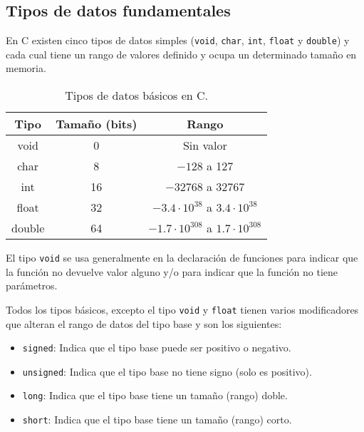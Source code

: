 \subsection{Tipos de datos fundamentales}{
En C existen cinco tipos de datos simples (\texttt{void}, \texttt{char}, \texttt{int}, \texttt{float} y \texttt{double}) y cada cual tiene un rango de valores definido y ocupa un determinado tamaño en memoria.
\begin{center}
	\begin{table}[htbp]
		\begin{center}
			\begin{tabular}{|c|c|c|}
				\hline
				\textbf{Tipo} & \textbf{Tamaño (bits)} & \textbf{Rango}  \\
				\hline 
				void & 0 & Sin valor\\ \hline
				char & 8 & $-128$ a 127\\ \hline
				int & 16 & $-32768$ a 32767\\ \hline
				float & 32 & $-3.4\cdot10^{38}$ a $3.4\cdot10^{38}$\\ \hline
				double & 64 & $-1.7\cdot10^{308}$ a $1.7\cdot10^{308}$		\\ \hline	
			\end{tabular}
			\caption{Tipos de datos básicos en C.}
			\label{tabla:Tipos de datos básicos en C}
		\end{center}
	\end{table}
\end{center}

El tipo \texttt{void} se usa generalmente en la declaración de funciones para indicar que la función no devuelve valor alguno y/o para indicar que la función no tiene parámetros.

Todos los tipos básicos, excepto el tipo \texttt{void} y \texttt{float} tienen varios modificadores que alteran el rango de datos del tipo base y son los siguientes:
\begin{itemize}
	\item \texttt{signed}: Indica que el tipo base puede ser positivo o negativo.
	\item \texttt{unsigned}: Indica que el tipo base no tiene signo (solo es positivo).
	\item \texttt{long}: Indica que el tipo base tiene un tamaño (rango) doble.
	\item \texttt{short}: Indica que el tipo base tiene un tamaño (rango) corto.
\end{itemize}
}
